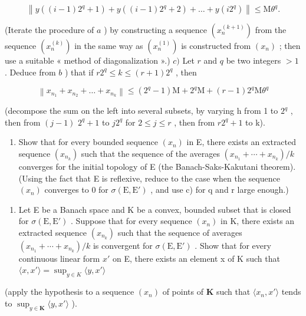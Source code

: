 \[
\left\| y ((i - 1) 2 ^ {q} + 1) + y ((i - 1) 2 ^ {q} + 2) + \dots + y (i 2 ^ {q}) \right\| \leqslant \mathrm{M} \theta^ {q}.
\]

(Iterate the procedure of \(a\) ) by constructing a sequence \((x_{n}^{(k + 1)})\) from the sequence \((x_{n}^{(k)})\) in the same way as \((x_{n}^{(1)})\) is constructed from \((x_{n})\) ; then use a suitable « method of diagonalization ».) \(c)\) Let \(r\) and \(q\) be two integers \(>1\) . Deduce from \(b\) ) that if \(r2^{q}\leqslant k\leqslant (r + 1)2^{q}\) , then

\[
\left\| x _ {n _ {1}} + x _ {n _ {2}} + \dots + x _ {n _ {k}} \right\| \leqslant (2 ^ {q} - 1) \mathrm{M} + 2 ^ {q} \mathrm{M} + (r - 1) 2 ^ {q} \mathrm{M} \theta^ {q}
\]

(decompose the sum on the left into several subsets, by varying h from 1 to \(2^{q}\) , then from \((j - 1)\) \(2^{q} + 1\) to \(j2^{q}\) for \(2 \leqslant j \leqslant r\) , then from \(r2^{q} + 1\) to k).

\begin{enumerate}
\def\labelenumi{\alph{enumi})}
\setcounter{enumi}{3}
\tightlist
\item
  Show that for every bounded sequence \((x_{n})\) in E, there exists an extracted sequence \((x_{n_{k}})\) such that the sequence of the averages \((x_{n_{1}} + \cdots + x_{n_{k}})/k\) converges for the initial topology of E (the Banach-Saks-Kakutani theorem). (Using the fact that E is reflexive, reduce to the case when the sequence \((x_{n})\) converges to 0 for \(\sigma(\mathrm{E}, \mathrm{E}')\) , and use c) for q and r large enough.)
\end{enumerate}

\begin{enumerate}
\def\labelenumi{\arabic{enumi})}
\setcounter{enumi}{33}
\tightlist
\item
  Let E be a Banach space and K be a convex, bounded subset that is closed for \(\sigma(\mathrm{E},\mathrm{E}')\) . Suppose that for every sequence \((x_{n})\) in K, there exists an extracted sequence \((x_{n_{k}})\) such that the sequence of averages \((x_{n_{1}}+\cdots+x_{n_{k}})/k\) is convergent for \(\sigma(\mathrm{E},\mathrm{E}')\) . Show that for every continuous linear form \(x'\) on E, there exists an element x of K such that \(\langle x,x'\rangle=\sup_{y\in K} \langle y,x'\rangle\)
\end{enumerate}

(apply the hypothesis to a sequence \((x_{n})\) of points of \(\mathbf{K}\) such that \(\langle x_n, x'\rangle\) tends to \(\sup_{y\in \mathbf{K}}\langle y, x'\rangle\) ).


